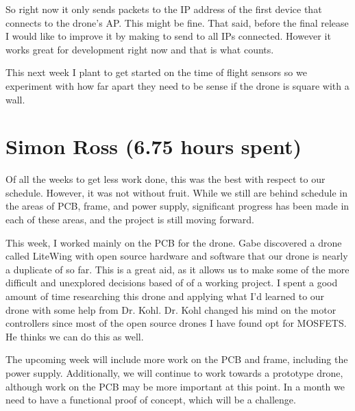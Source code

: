 \documentclass[12pt, titlepage]{article}
\begin{document}
So right now it only sends packets to the IP address of the first device that connects to the drone’s AP. This might be fine. That said, before the final release I would like to improve it by making to send to all IPs connected. However it works great for development right now and that is what counts.

This next week I plant to get started on the time of flight sensors so we experiment with how far apart they need to be sense if the drone is square with a wall.

\section*{Simon Ross (6.75 hours spent)}

Of all the weeks to get less work done, this was the best with respect to our schedule. However, it was not without fruit. While we still are behind schedule in the areas of PCB, frame, and power supply, significant progress has been made in each of these areas, and the project is still moving forward.

This week, I worked mainly on the PCB for the drone. Gabe discovered a drone called LiteWing with open source hardware and software that our drone is nearly a duplicate of so far. This is a great aid, as it allows us to make some of the more difficult and unexplored decisions based of of a working project. I spent a good amount of time researching this drone and applying what I'd learned to our drone with some help from Dr. Kohl. Dr. Kohl changed his mind on the motor controllers since most of the open source drones I have found opt for MOSFETS. He thinks we can do this as well.

The upcoming week will include more work on the PCB and frame, including the power supply. Additionally, we will continue to work towards a prototype drone, although work on the PCB may be more important at this point. In a month we need to have a functional proof of concept, which will be a challenge.
\end{document}
